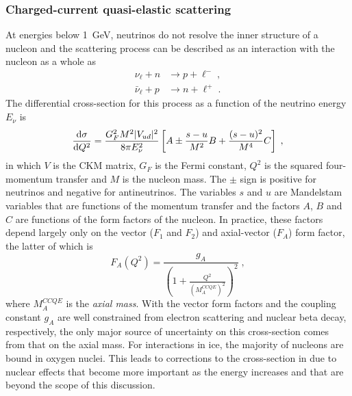\subsubsection{Charged-current quasi-elastic scattering}
At energies below \SI{1}{GeV}, neutrinos do not resolve the inner structure of a nucleon and the scattering process can be described as an interaction with the nucleon as a whole as
\begin{equation}
\begin{aligned}
    \nu_\ell + n &\rightarrow p + \ell^-\;,\\
    \bar{\nu}_\ell + p &\rightarrow n + \ell^+\;.
\end{aligned}
\end{equation}
The differential cross-section for this process as a function of the neutrino energy $E_\nu$ is 
\begin{equation}
    \frac{\mathrm{d}\sigma}{\mathrm{d} Q^2} = \frac{G_F^2 M^2 |V_{ud}|^2}{8\pi E^2_\nu}
    \left[
        A \pm \frac{s-u}{M^2}B + \frac{(s-u)^2}{M^4}C 
    \right]\;,\label{eq:ccqe-xsec}
\end{equation}
in which $V$ is the CKM matrix, $G_F$ is the Fermi constant, $Q^2$ is the squared four-momentum transfer and $M$ is the nucleon mass. The $\pm$ sign is positive for neutrinos and negative for antineutrinos. The variables $s$ and $u$ are Mandelstam variables that are functions of the momentum transfer and the factors $A$, $B$ and $C$ are functions of the form factors of the nucleon. In practice, these factors depend largely only on the vector ($F_1$ and $F_2$) and axial-vector ($F_A$) form factor, the latter of which is 
\begin{equation}
    F_A(Q^2) = \frac{g_A}{\left(1 + \frac{Q^2}{(M_A^{CCQE})^2}\right)^2}\;,\label{eq:axial-mass-form-factor}
\end{equation}
where $M_A^{CCQE}$ is the \emph{axial mass}. With the vector form factors and the coupling constant $g_A$ are well constrained from electron scattering and nuclear beta decay, respectively, the only major source of uncertainty on this cross-section comes from that on the axial mass. For interactions in ice, the majority of nucleons are bound in oxygen nuclei. This leads to corrections to the cross-section in  due to nuclear effects that become more important as the energy increases and that are beyond the scope of this discussion. 

